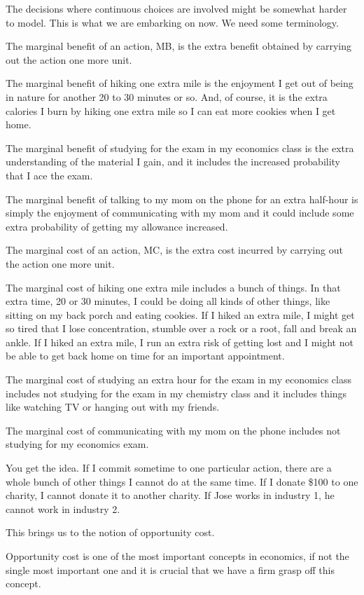 \documentclass[
]{book}
\begin{document}
The decisions where continuous choices are involved might be somewhat harder to model. This is what we are embarking on now. We need some terminology.

The marginal benefit of an action, MB, is the extra benefit obtained by carrying out the action one more unit.

The marginal benefit of hiking one extra mile is the enjoyment I get out of being in nature for another 20 to 30 minutes or so. And, of course, it is the extra calories I burn by hiking one extra mile so I can eat more cookies when I get home.

The marginal benefit of studying for the exam in my economics class is the extra understanding of the material I gain, and it includes the increased probability that I ace the exam.

The marginal benefit of talking to my mom on the phone for an extra half-hour is simply the enjoyment of communicating with my mom and it could include some extra probability of getting my allowance increased.

The marginal cost of an action, MC, is the extra cost incurred by carrying out the action one more unit.

The marginal cost of hiking one extra mile includes a bunch of things. In that extra time, 20 or 30 minutes, I could be doing all kinds of other things, like sitting on my back porch and eating cookies. If I hiked an extra mile, I might get so tired that I lose concentration, stumble over a rock or a root, fall and break an ankle. If I hiked an extra mile, I run an extra risk of getting lost and I might not be able to get back home on time for an important appointment.

The marginal cost of studying an extra hour for the exam in my economics class includes not studying for the exam in my chemistry class and it includes things like watching TV or hanging out with my friends.

The marginal cost of communicating with my mom on the phone includes not studying for my economics exam.

You get the idea. If I commit sometime to one particular action, there are a whole bunch of other things I cannot do at the same time. If I donate \$100 to one charity, I cannot donate it to another charity. If Jose works in industry 1, he cannot work in industry 2.

This brings us to the notion of opportunity cost.

Opportunity cost is one of the most important concepts in economics, if not the single most important one and it is crucial that we have a firm grasp off this concept.
\end{document}
